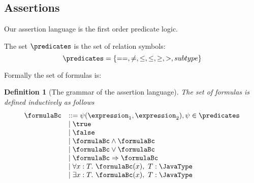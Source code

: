 
\newtheorem{assertion}{Definition}[subsection]

\subsection{Assertions} \label{formulas}

Our assertion language is the first order predicate logic.

The set $\predicates$  is the set of relation symbols:
 $$\predicates = \{  ==, \neq, \leq, \le, \geq, >, subtype  \}$$
 
Formally the set of formulas is:
\begin{assertion}[The grammar of the assertion language]
The set of formulas is defined inductively as follows
	$$
	\begin{array}{ll}
	\formulaBc & ::= \psi( \expression_1, \expression_2) , \psi \in \predicates  \\
	  & \mid \true \\
	  & \mid  \false \\	
	  & \mid \formulaBc  \wedge  \formulaBc \\
	  & \mid \formulaBc \vee  \formulaBc \\
	  & \mid \formulaBc  \Rightarrow \formulaBc \\
	  & \mid \forall x : T  . \ \formulaBc(x) , \ T :  \JavaType \\
	  & \mid \exists x  : T . \ \formulaBc(x) , \ T :  \JavaType
	\end{array}
	$$ 
\end{assertion}

%
